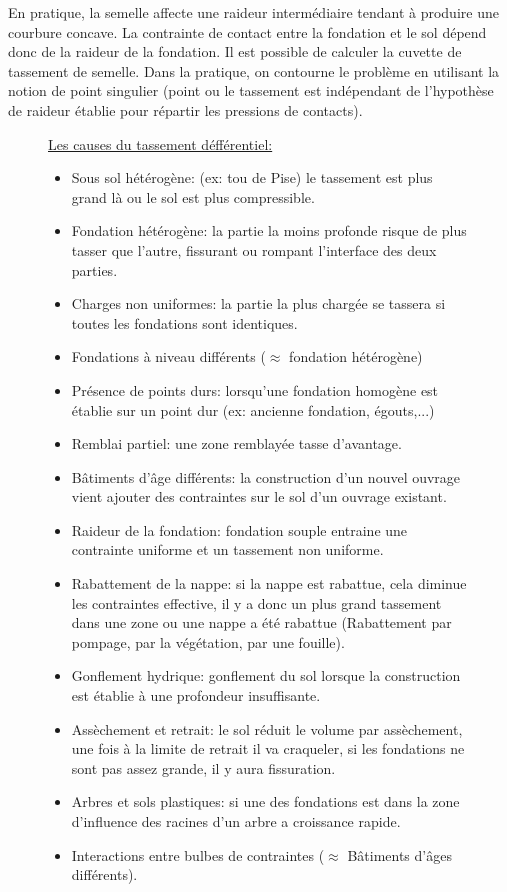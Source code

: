             En pratique, la semelle affecte une raideur intermédiaire tendant à produire une courbure concave. La contrainte de contact entre la fondation et le sol dépend donc de la raideur de la fondation. Il est possible de calculer la cuvette de tassement de semelle. Dans la pratique, on contourne le problème en utilisant la notion de point singulier (point ou le tassement est indépendant de l'hypothèse de raideur établie pour répartir les pressions de contacts). 
            
            \begin{figure}[h!]
            \underline{Les causes du tassement défférentiel:}
            
            \begin{itemize}
                \item Sous sol hétérogène: (ex: tou de Pise) le tassement est plus grand là ou le sol est plus compressible.
                 \item Fondation hétérogène: la partie la moins profonde risque de plus tasser que l'autre, fissurant ou rompant l'interface des deux parties.
                 \item Charges non uniformes: la partie la plus chargée se tassera si toutes les fondations sont identiques.
                 \item Fondations à niveau différents ($\approx$ fondation hétérogène)
                 \item Présence de points durs: lorsqu'une fondation homogène est établie sur un point dur (ex: ancienne fondation, égouts,...)
                 \item Remblai partiel: une zone remblayée tasse d'avantage.
                 \item Bâtiments d'âge différents: la construction d'un nouvel ouvrage vient ajouter des contraintes sur le sol d'un ouvrage existant.
                 \item Raideur de la fondation: fondation souple entraine une contrainte uniforme et un tassement non uniforme.
                 \item Rabattement de la nappe: si la nappe est rabattue, cela diminue les contraintes effective, il y a donc un plus grand tassement dans une zone ou une nappe a été rabattue (Rabattement par pompage, par la végétation, par une fouille).
                 \item Gonflement hydrique: gonflement du sol lorsque la construction est établie à une profondeur insuffisante.
                 \item Assèchement et retrait: le sol réduit le volume par assèchement, une fois à la limite de retrait il va craqueler, si les fondations ne sont pas assez grande, il y aura fissuration.
                 \item Arbres et sols plastiques: si une des fondations est dans la zone d'influence des racines d'un arbre a croissance rapide.
                 \item Interactions entre bulbes de contraintes ($\approx$ Bâtiments d'âges différents).
            \end{itemize}
            

\end{figure}
